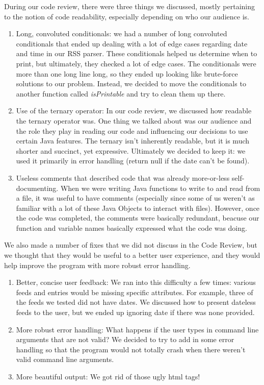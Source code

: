 \documentclass{article}
\begin{document}

During our code review, there were three things we discussed, mostly pertaining to the notion of code readability, especially depending on who our audience is.  

\begin{enumerate}
\item Long, convoluted conditionals: we had a number of long convoluted conditionals that ended up dealing with a lot of edge cases regarding date and time in our RSS parser.  These conditionals helped us determine when to print, but ultimately, they checked a lot of edge cases.  The conditionals were more than one long line long, so they ended up looking like brute-force solutions to our problem.  Instead, we decided to move the conditionals to another function called \emph{isPrintable} and try to clean them up there.
\item Use of the ternary operator: In our code review, we discussed how readable the ternary operator was.  One thing we talked about was our audience and the role they play in reading our code and influencing our decisions to use certain Java features.  The ternary isn't inherently readable, but it is much shorter and succinct, yet expressive.  Ultimately we decided to keep it: we used it primarily in error handling (return null if the date can't be found).  
\item Useless comments that described code that was already more-or-less self-documenting.  When we were writing Java functions to write to and read from a file, it was useful to have comments (especially since some of us weren't as familiar with a lot of these Java Objects to interact with files).  However, once the code was completed, the comments were basically redundant, beacuse our function and variable names basically expressed what the code was doing.

\end{enumerate}


We also made a number of fixes that we did not discuss in the Code Review, but we thought that they would be useful to a better user experience, and they would help improve the program with more robust error handling.  

\begin{enumerate}
\item Better, concise user feedback: We ran into this difficulty a few times: various feeds and entries would be missing specific attributes.  For example, three of the feeds we tested did not have dates.  We discussed how to present dateless feeds to the user, but we ended up ignoring date if there was none provided.
\item More robust error handling: What happens if the user types in command line arguments that are not valid?  We decided to try to add in some error handling so that the program would not totally crash when there weren't valid command line arguments.  
\item More beautiful output: We got rid of those ugly html tags!
\end{enumerate}
\end{document}
